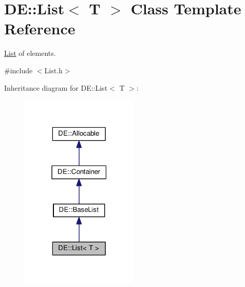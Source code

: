 \hypertarget{classDE_1_1List}{}\section{DE\+:\+:List$<$ T $>$ Class Template Reference}
\label{classDE_1_1List}


\hyperlink{classDE_1_1List}{List} of elements.  




{\ttfamily \#include $<$List.\+h$>$}



Inheritance diagram for DE\+:\+:List$<$ T $>$\+:
\nopagebreak
\begin{figure}[H]
\begin{center}
\leavevmode
\includegraphics[width=159pt]{classDE_1_1List__inherit__graph}
\end{center}
\end{figure}


